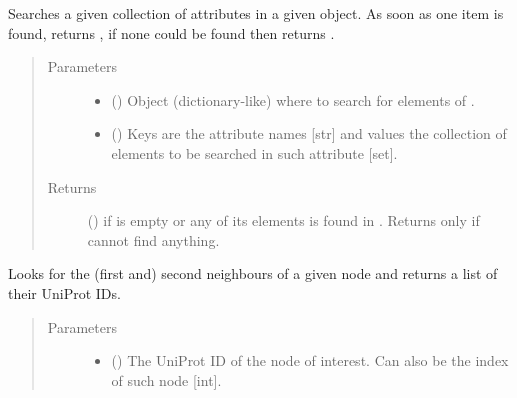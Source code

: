 \documentclass[letterpaper,10pt,english]{sphinxmanual}
\begin{document}
\begin{fulllineitems}
\begin{fulllineitems}
\label{\detokenize{main:pypath.main.PyPath.search_attr_or}}
Searches a given collection of attributes in a given object. As
soon as one item is found, returns , if none could be
found then returns .
\begin{quote}\begin{description}
\item[{Parameters}] \leavevmode\begin{itemize}
\item {} 
 () \textendash{} Object (dictionary-like) where to search for elements of
.

\item {} 
 () \textendash{} Keys are the attribute names {[}str{]} and values the collection
of elements to be searched in such attribute {[}set{]}.

\end{itemize}

\item[{Returns}] \leavevmode
() \textendash{}  if  is empty or any of its
elements is found in . Returns only  if cannot
find anything.

\end{description}\end{quote}

\end{fulllineitems}


\begin{fulllineitems}
\label{\detokenize{main:pypath.main.PyPath.second_neighbours}}
Looks for the (first and) second neighbours of a given node and
returns a list of their UniProt IDs.
\begin{quote}\begin{description}
\item[{Parameters}] \leavevmode\begin{itemize}
\item {} 
 () \textendash{} The UniProt ID of the node of interest. Can also be the
index of such node {[}int{]}.


\end{itemize}
\end{description}
\end{quote}
\end{fulllineitems}
\end{fulllineitems}
\end{document}
